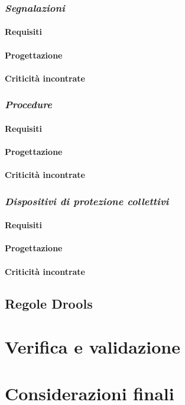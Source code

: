 \subsubsection{\textit{Segnalazioni}}
	\paragraph{Requisiti}
	\paragraph{Progettazione}
	\paragraph{Criticità incontrate}
\subsubsection{\textit{Procedure}}
	\paragraph{Requisiti}
	\paragraph{Progettazione}
	\paragraph{Criticità incontrate}
\subsubsection{\textit{Dispositivi di protezione collettivi}}
	\paragraph{Requisiti}
	\paragraph{Progettazione}
	\paragraph{Criticità incontrate}


\subsection{Regole Drools}
	
\section{Verifica e validazione}
\section{Considerazioni finali}